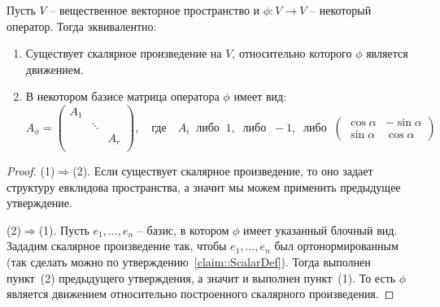 \begin{claim}
Пусть $V$ -- вещественное векторное пространство и $\phi\colon V\to V$ -- некоторый оператор.
Тогда эквивалентно:
\begin{enumerate}
\item Существует скалярное произведение на $V$, относительно которого $\phi$ является движением.

\item В некотором базисе матрица оператора $\phi$ имеет вид:
\[
A_\phi=
\begin{pmatrix}
{A_1}&{}&{}\\
{}&{\ddots}&{}\\
{}&{}&{A_r}\\
\end{pmatrix},
\quad\text{где}\quad
A_i\;\;\text{либо}\;\;1,\;\;\text{либо}\;\;-1,\;\;\text{либо}\;\;
\begin{pmatrix}
{\cos \alpha}&{-\sin\alpha}\\
{\sin\alpha}&{\cos\alpha}
\end{pmatrix}
\]
\end{enumerate}
\end{claim}
\begin{proof}
(1)$\Rightarrow$(2).
Если существует скалярное произведение, то оно задает структуру евклидова пространства, а значит мы можем применить предыдущее утверждение.

(2)$\Rightarrow$(1).
Пусть $e_1,\ldots,e_n$ -- базис, в котором $\phi$ имеет указанный блочный вид.
Зададим скалярное произведение так, чтобы $e_1,\ldots,e_n$ был ортонормированным (так сделать можно по утверждению~\ref{claim::ScalarDef}).
Тогда выполнен пункт~(2) предыдущего утверждения, а значит и выполнен пункт~(1).
То есть $\phi$ является движением относительно построенного скалярного произведения.
\end{proof}

